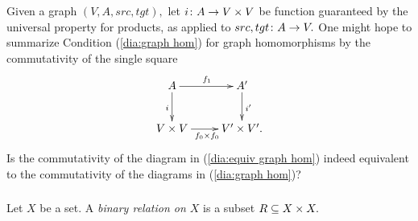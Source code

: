 \documentclass[../main/CT4S-EN-RU]{subfiles}
\begin{document}
\begin{exerciseENG}\label{exc:single condition for graph hom}
Given a graph $(V,A,src,tgt),$ let $i\taking A\to V\times V$ be function guaranteed by the universal property for products, as applied to $src,tgt\taking A\to V.$ One might hope to summarize Condition (\ref{dia:graph hom}) for graph homomorphisms by the commutativity of the single square 
\begin{align}\label{dia:equiv graph hom}
\xymatrix{A\ar[r]^{f_1}\ar[d]_{i}&A'\ar[d]^{i'}\\V\times V\ar[r]_{f_0\times f_0}&V'\times V'.}
\end{align}
Is the commutativity of the diagram in (\ref{dia:equiv graph hom}) indeed equivalent to the commutativity of the diagrams in (\ref{dia:graph hom})?
\end{exerciseENG}

\begin{exerciseRUS}\label{exc:single condition for graph hom}
\end{exerciseRUS}


\subsubsection{}

\begin{definitionENG}\label{def:binary relation}
Let $X$ be a set. A {\em binary relation on $X$} is a subset $R\ss X\times X.$ 
\end{definitionENG}

\begin{definitionRUS}\label{def:binary relation}
\end{definitionRUS}
\end{document}
